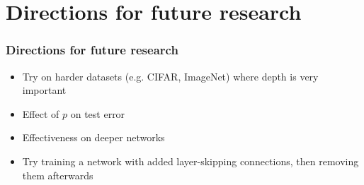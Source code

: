 \documentclass[pdf]{beamer}
\begin{document}
\section{Directions for future research}
\begin{frame}
	\frametitle{Directions for future research}
	\begin{itemize}
		\item<1-> Try on harder datasets (e.g. CIFAR, ImageNet) where depth is very important
		\item<2-> Effect of $p$ on test error
		\item<3-> Effectiveness on deeper networks
		\item<4-> Try training a network with added layer-skipping connections, then removing them afterwards
	\end{itemize}
\end{frame}
\end{document}
